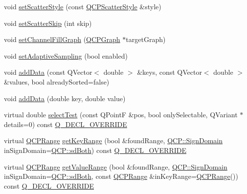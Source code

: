 \begin{DoxyCompactItemize}
\item 
void \hyperlink{class_q_c_p_graph_a12bd17a8ba21983163ec5d8f42a9fea5}{set\+Scatter\+Style} (const \hyperlink{class_q_c_p_scatter_style}{Q\+C\+P\+Scatter\+Style} \&style)
\item 
void \hyperlink{class_q_c_p_graph_a17cebd3196f434258abb82ba6dc443f2}{set\+Scatter\+Skip} (int skip)
\item 
void \hyperlink{class_q_c_p_graph_a2d03156df1b64037a2e36cfa50351ca3}{set\+Channel\+Fill\+Graph} (\hyperlink{class_q_c_p_graph}{Q\+C\+P\+Graph} $\ast$target\+Graph)
\item 
void \hyperlink{class_q_c_p_graph_ab468cd600160f327836aa0644291e64c}{set\+Adaptive\+Sampling} (bool enabled)
\item 
void \hyperlink{class_q_c_p_graph_ae0555c0d3fe0fa7cb8628f88158d420f}{add\+Data} (const Q\+Vector$<$ double $>$ \&keys, const Q\+Vector$<$ double $>$ \&values, bool already\+Sorted=false)
\item 
void \hyperlink{class_q_c_p_graph_a0bf98b1972286cfb7b1c4b7dd6ae2012}{add\+Data} (double key, double value)
\item 
virtual double \hyperlink{class_q_c_p_graph_a6d669d04462d272c6aa0e5f85846d673}{select\+Test} (const Q\+PointF \&pos, bool only\+Selectable, Q\+Variant $\ast$details=0) const \hyperlink{qcustomplot_8h_a42cc5eaeb25b85f8b52d2a4b94c56f55}{Q\+\_\+\+D\+E\+C\+L\+\_\+\+O\+V\+E\+R\+R\+I\+DE}
\item 
virtual \hyperlink{class_q_c_p_range}{Q\+C\+P\+Range} \hyperlink{class_q_c_p_graph_aac47c6189e3aea46ea46939e5d14796c}{get\+Key\+Range} (bool \&found\+Range, \hyperlink{namespace_q_c_p_afd50e7cf431af385614987d8553ff8a9}{Q\+C\+P\+::\+Sign\+Domain} in\+Sign\+Domain=\hyperlink{namespace_q_c_p_afd50e7cf431af385614987d8553ff8a9aa38352ef02d51ddfa4399d9551566e24}{Q\+C\+P\+::sd\+Both}) const \hyperlink{qcustomplot_8h_a42cc5eaeb25b85f8b52d2a4b94c56f55}{Q\+\_\+\+D\+E\+C\+L\+\_\+\+O\+V\+E\+R\+R\+I\+DE}
\item 
virtual \hyperlink{class_q_c_p_range}{Q\+C\+P\+Range} \hyperlink{class_q_c_p_graph_a8f773e56f191a61c06e129e90a604d77}{get\+Value\+Range} (bool \&found\+Range, \hyperlink{namespace_q_c_p_afd50e7cf431af385614987d8553ff8a9}{Q\+C\+P\+::\+Sign\+Domain} in\+Sign\+Domain=\hyperlink{namespace_q_c_p_afd50e7cf431af385614987d8553ff8a9aa38352ef02d51ddfa4399d9551566e24}{Q\+C\+P\+::sd\+Both}, const \hyperlink{class_q_c_p_range}{Q\+C\+P\+Range} \&in\+Key\+Range=\hyperlink{class_q_c_p_range}{Q\+C\+P\+Range}()) const \hyperlink{qcustomplot_8h_a42cc5eaeb25b85f8b52d2a4b94c56f55}{Q\+\_\+\+D\+E\+C\+L\+\_\+\+O\+V\+E\+R\+R\+I\+DE}
\end{DoxyCompactItemize}

